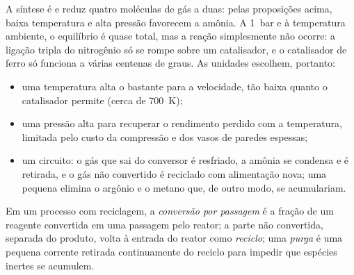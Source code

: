 A síntese é  e reduz quatro moléculas de gás a duas: pelas
proposições acima, baixa temperatura e alta pressão favorecem a amônia.
A \qty{1}{bar} e à temperatura ambiente, o equilíbrio é quase total, mas
a reação simplesmente não ocorre: a ligação tripla do nitrogênio só se
rompe sobre um catalisador, e o catalisador de ferro só funciona a várias
centenas de graus. As unidades escolhem, portanto:
\begin{itemize}
  \item uma temperatura alta o bastante para a velocidade, tão baixa quanto o
        catalisador permite (cerca de \qty{700}{K});
  \item uma pressão alta para recuperar o rendimento perdido com a
        temperatura, limitada pelo custo da compressão e dos vasos de
        paredes espessas;
  \item um circuito: o gás que sai do conversor é resfriado, a amônia se
        condensa e é retirada, e o gás não convertido é reciclado com
        alimentação nova; uma pequena  elimina o argônio e o metano
        que, de outro modo, se acumulariam.
\end{itemize}

\begin{definition}\label{def:b2:equilibrium-shifts:single-pass}
Em um processo com reciclagem, a \emph{conversão por passagem}
é a fração de um reagente convertida em uma passagem pelo
reator; a parte não convertida, separada do produto, volta à entrada do
reator como \emph{reciclo}; uma
\emph{purga} é uma pequena corrente retirada continuamente do
reciclo para impedir que espécies inertes se acumulem.
\end{definition}

